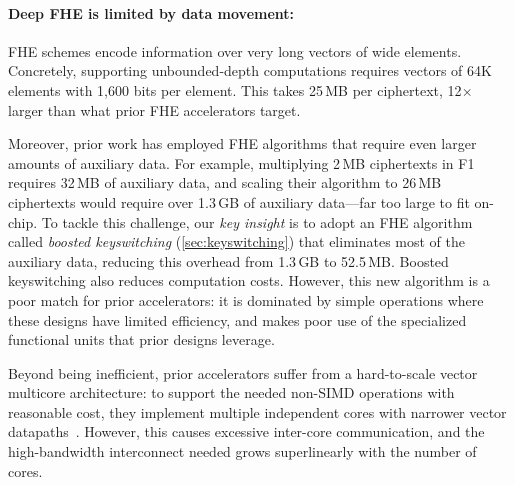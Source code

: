 \paragraph{Deep FHE is limited by data movement:}
FHE schemes encode information over very long vectors of wide elements.
Concretely, supporting unbounded-depth computations requires vectors of
64K elements with 1,600 bits per element.
This takes 25\,MB per ciphertext, 12$\times$ larger than what prior FHE accelerators target.

Moreover, prior work has employed FHE algorithms that require even larger amounts of auxiliary data.
For example, multiplying 2\,MB ciphertexts in F1~\cite{feldmann:micro21:f1} requires 32\,MB of auxiliary data,
and scaling their algorithm to 26\,MB ciphertexts would require over
1.3\,GB 
of auxiliary data---far too large to fit on-chip.
To tackle this challenge, our \emph{key insight} is to adopt an FHE
algorithm called \emph{boosted keyswitching} (\autoref{sec:keyswitching}) that eliminates most of the
auxiliary data,
reducing this overhead from 1.3\,GB to 52.5\,MB.
Boosted keyswitching also reduces computation costs.
However, this new algorithm is a poor match for prior accelerators:
it is dominated by simple operations where these designs have limited efficiency,
and makes poor use of the specialized functional units that prior designs leverage.

Beyond being inefficient, prior accelerators suffer from a hard-to-scale vector multicore architecture:
to support the needed non-SIMD operations with reasonable cost,
they implement multiple independent cores with narrower vector datapaths~\cite{feldmann:micro21:f1}.
However, this causes excessive inter-core communication,
and the high-bandwidth interconnect
needed grows superlinearly with the number of cores.


